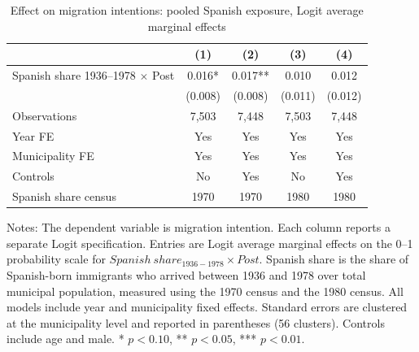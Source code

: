\begin{table}[!htbp]
\normalsize
\renewcommand{\arraystretch}{1.15}
\centering
\caption{Effect on migration intentions: pooled Spanish exposure, Logit average marginal effects}
\label{tab:post_pooled_share_ame_stata}
\setlength{\tabcolsep}{4pt}
\captionsetup{justification=centering}
\begin{tabular}{lcccc}
\hline
 & (1) & (2) & (3) & (4) \\
\hline
Spanish share 1936--1978 \(\times\) Post & 0.016* & 0.017** & 0.010 & 0.012 \\
 & (0.008) & (0.008) & (0.011) & (0.012) \\
\hline
Observations &        7,503 &        7,448 &        7,503 &        7,448 \\
Year FE & Yes & Yes & Yes & Yes \\
Municipality FE & Yes & Yes & Yes & Yes \\
Controls & No & Yes & No & Yes \\
Spanish share census & 1970 & 1970 & 1980 & 1980 \\
\hline
\end{tabular}
\par\vspace{1.5mm}
\begin{minipage}{0.98\linewidth}
\footnotesize\setlength{\parindent}{0pt}\setlength{\parskip}{1pt}
Notes: The dependent variable is migration intention. Each column reports a separate Logit specification. Entries are Logit average marginal effects on the 0--1 probability scale for \(Spanish\ share_{1936-1978} \times Post\). Spanish share is the share of Spanish-born immigrants who arrived between 1936 and 1978 over total municipal population, measured using the 1970 census and the 1980 census. All models include year and municipality fixed effects. Standard errors are clustered at the municipality level and reported in parentheses (56 clusters). Controls include age and male. * \(p<0.10\), ** \(p<0.05\), *** \(p<0.01\).
\end{minipage}
\end{table}
